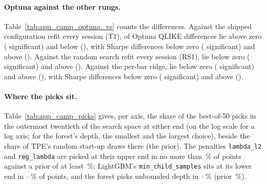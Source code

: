 \paragraph{Optuna against the other rungs.} Table~\ref{tab:app_camp_optuna_vs} counts the
differences. Against the shipped configuration refit every session (T1), \campOptTQAbove{} of
\campOptTN{} Optuna QLIKE differences lie above zero (\campOptTQAboveSig{} significant) and
\campOptTQBelow{} below (\campOptTQBelowSig{}), with \campOptTSBelow{} Sharpe differences
below zero (\campOptTSBelowSig{} significant) and \campOptTSAbove{} above
(\campOptTSAboveSig{}). Against the random search refit every session (RS1),
\campOptRSQBelow{} lie below zero (\campOptRSQBelowSig{} significant) and
\campOptRSQAbove{} above (\campOptRSQAboveSig{}). Against the per-bar ridge,
\campOptRidgeQBelow{} lie below zero (\campOptRidgeQBelowSig{} significant) and
\campOptRidgeQAbove{} above (\campOptRidgeQAboveSig{}), with \campOptRidgeSBelow{} Sharpe
differences below zero (\campOptRidgeSBelowSig{} significant) and \campOptRidgeSAbove{}
above (\campOptRidgeSAboveSig{}).

\paragraph{Where the picks sit.} Table~\ref{tab:app_camp_picks} gives, per axis, the share of
the best-of-50 picks in the outermost twentieth of the search space at either end (on the
log scale for a log axis; for the forest's depth, the smallest and the largest choice),
beside the share of TPE's random start-up draws there (the prior).
The penalties
\texttt{lambda\_l2} and \texttt{reg\_lambda} are picked at their upper end in no more than
\campPickLambdaHighMax\,\% of points against a prior of at least \campPickLambdaPriorLo\,\%;
LightGBM's \texttt{min\_child\_samples} sits at its lower end in
\campPickLgbmMcsLo--\campPickLgbmMcsHi\,\% of points, and the forest picks unbounded depth in
\campPickRfDepthLo--\campPickRfDepthHi\,\% (prior \campPickRfDepthPrior\,\%).

